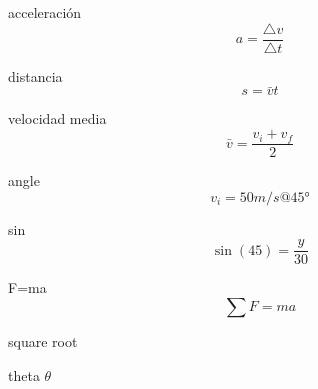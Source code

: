 
acceleración
\[ a=\frac{\triangle{v}}{\triangle{t}} \]

distancia
\[ s=\bar{v}t \]

velocidad media
\[ \bar{v} = \frac{v_i+v_f}{2} \]

angle
\[ v_i=50m/s @ \ang{45} \]

sin
\[ \sin(45)=\frac{y}{30} \]

F=ma
\[ \sum F=ma \]

square root
\sqrt{}

theta
$\theta$
